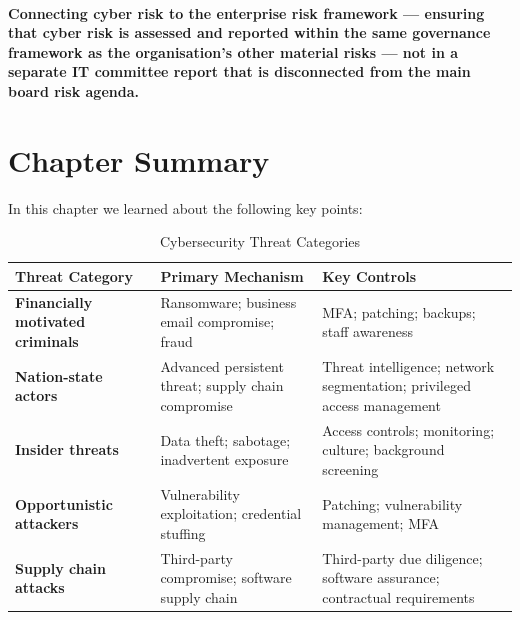\paragraph{\textbf{Connecting cyber risk to the enterprise risk framework} — ensuring that cyber risk is assessed and reported within the same governance framework as the organisation's other material risks — not in a separate IT committee report that is disconnected from the main board risk agenda.}

\newpage
\section{Chapter Summary}
In this chapter we learned about the following key points:

\begin{table}[H]
  \centering
  \renewcommand{\arraystretch}{1.5}
  \begin{tabularx}{\textwidth}{ | >{\raggedright\arraybackslash}p{} 
								| >{\raggedright\arraybackslash}p{} 
                                | >{\raggedright\arraybackslash}X | }
    \hline
    \textbf{Threat Category} & \textbf{Primary Mechanism} & \textbf{Key Controls} \\
    \hline
    \textbf{Financially motivated criminals} & Ransomware; business email compromise; fraud & MFA; patching; backups; staff awareness\\
    \hline
    \textbf{Nation-state actors} & Advanced persistent threat; supply chain compromise & Threat intelligence; network segmentation; privileged access management\\
    \hline
    \textbf{Insider threats} & Data theft; sabotage; inadvertent exposure & Access controls; monitoring; culture; background screening\\
    \hline
    \textbf{Opportunistic attackers} & Vulnerability exploitation; credential stuffing & Patching; vulnerability management; MFA\\
    \hline
    \textbf{Supply chain attacks} & Third-party compromise; software supply chain & Third-party due diligence; software assurance; contractual requirements\\
    \hline
  \end{tabularx}
  \caption{Cybersecurity Threat Categories}
\end{table}

